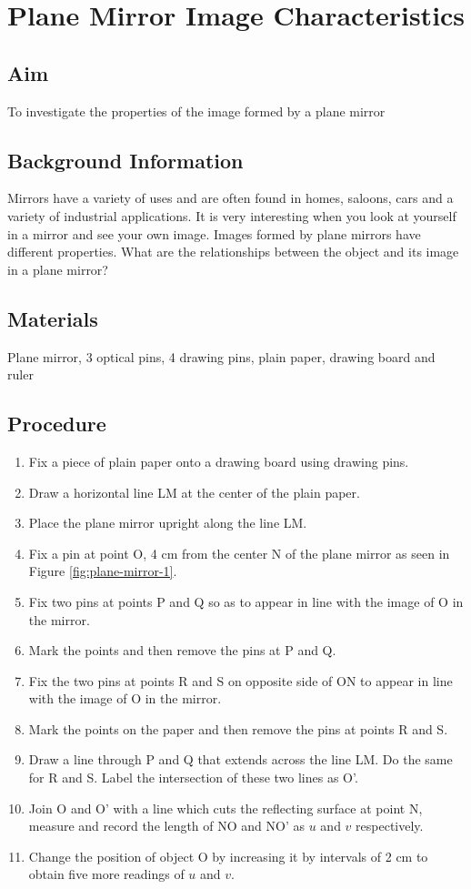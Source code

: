 \chapter{Plane Mirror Image Characteristics}

\section{Aim}
To investigate the properties of the image formed by a plane mirror

\section{Background Information}
Mirrors have a variety of uses and are often found in homes, saloons, cars and a variety of industrial applications. It is very interesting when you look at yourself in a mirror and see your own image. Images formed by plane mirrors have different properties. What are the relationships between the object and its image in a plane mirror?

\section{Materials}
Plane mirror, 3 optical pins, 4 drawing pins, plain paper, drawing board and ruler

\section{Procedure}
\begin{enumerate}
\item Fix a piece of plain paper onto a drawing board using drawing pins.
\item Draw a horizontal line LM at the center of the plain paper.
\item Place the plane mirror upright along the line LM.
\item Fix a pin at point O, 4 cm from the center N of the plane mirror as seen in Figure \ref{fig:plane-mirror-1}.
\item Fix two pins at points P and Q so as to appear in line with the image of O in the mirror. 
\item Mark the points and then remove the pins at P and Q.
\item Fix the two pins at points R and S on opposite side of ON to appear in line with the image of O in the mirror.
\item Mark the points on the paper and then remove the pins at points R and S. 
\item Draw a line through P and Q that extends across the line LM. Do the same for R and S. Label the intersection of these two lines as O’.
\item Join O and O’ with a line which cuts the reflecting surface at point N, measure and record the length of NO and NO’ as $u$ and $v$  respectively.
\item Change the position of object O by increasing it by intervals of 2 cm to obtain five more readings of $u$ and $v$. 
\end{enumerate}

